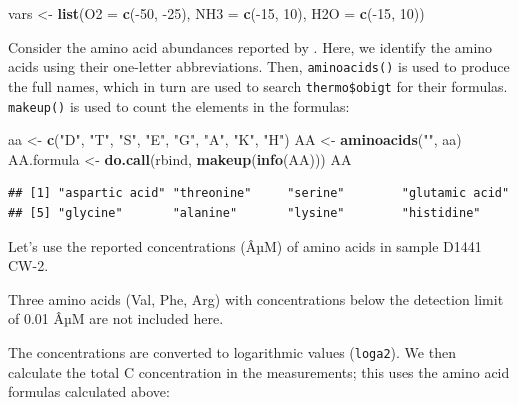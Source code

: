 \documentclass[]{tufte-handout}
\newenvironment{Shaded}{}{}
\newcommand{\KeywordTok}[1]{\textcolor[rgb]{0.00,0.44,0.13}{\textbf{#1}}}
\newcommand{\DataTypeTok}[1]{\textcolor[rgb]{0.56,0.13,0.00}{#1}}
\newcommand{\DecValTok}[1]{\textcolor[rgb]{0.25,0.63,0.44}{#1}}
\newcommand{\StringTok}[1]{\textcolor[rgb]{0.25,0.44,0.63}{#1}}
\newcommand{\OperatorTok}[1]{\textcolor[rgb]{0.40,0.40,0.40}{#1}}
\newcommand{\NormalTok}[1]{#1}
\begin{document}
\begin{Shaded}
\begin{Highlighting}[]
\NormalTok{vars <-}\StringTok{ }\KeywordTok{list}\NormalTok{(}\DataTypeTok{O2 =} \KeywordTok{c}\NormalTok{(}\OperatorTok{-}\DecValTok{50}\NormalTok{, }\OperatorTok{-}\DecValTok{25}\NormalTok{), }\DataTypeTok{NH3 =} \KeywordTok{c}\NormalTok{(}\OperatorTok{-}\DecValTok{15}\NormalTok{, }\DecValTok{10}\NormalTok{), }\DataTypeTok{H2O =} \KeywordTok{c}\NormalTok{(}\OperatorTok{-}\DecValTok{15}\NormalTok{, }\DecValTok{10}\NormalTok{))}
\end{Highlighting}
\end{Shaded}

Consider the amino acid abundances reported by \citet{FMM_14}. Here, we
identify the amino acids using their one-letter abbreviations. Then,
{\texttt{aminoacids()}} is used to produce the full names, which in turn
are used to search \texttt{thermo\$obigt} for their formulas.
{\texttt{makeup()}} is used to count the elements in the formulas:

\begin{Shaded}
\begin{Highlighting}[]
\NormalTok{aa <-}\StringTok{ }\KeywordTok{c}\NormalTok{(}\StringTok{"D"}\NormalTok{, }\StringTok{"T"}\NormalTok{, }\StringTok{"S"}\NormalTok{, }\StringTok{"E"}\NormalTok{, }\StringTok{"G"}\NormalTok{, }\StringTok{"A"}\NormalTok{, }\StringTok{"K"}\NormalTok{, }\StringTok{"H"}\NormalTok{)}
\NormalTok{AA <-}\StringTok{ }\KeywordTok{aminoacids}\NormalTok{(}\StringTok{""}\NormalTok{, aa)}
\NormalTok{AA.formula <-}\StringTok{ }\KeywordTok{do.call}\NormalTok{(rbind, }\KeywordTok{makeup}\NormalTok{(}\KeywordTok{info}\NormalTok{(AA)))}
\NormalTok{AA}
\end{Highlighting}
\end{Shaded}

\begin{verbatim}
## [1] "aspartic acid" "threonine"     "serine"        "glutamic acid"
## [5] "glycine"       "alanine"       "lysine"        "histidine"
\end{verbatim}

Let's use the reported concentrations (ÂµM) of amino acids in sample
D1441 CW-2.

\begin{marginfigure}
Three amino acids (Val, Phe, Arg) with concentrations below the
detection limit of 0.01 ÂµM are not included here.
\end{marginfigure}

The concentrations are converted to logarithmic values (\texttt{loga2}).
We then calculate the total C concentration in the measurements; this
uses the amino acid formulas calculated above:
\end{document}
